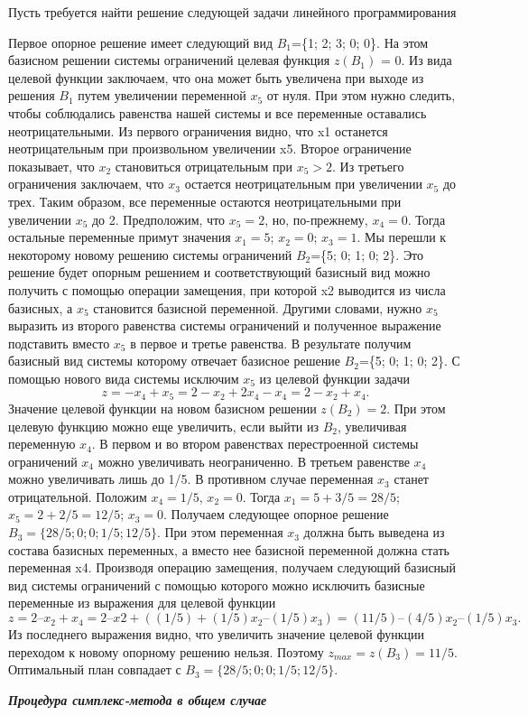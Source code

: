 \documentclass{article}
\begin{document}
Пусть требуется найти решение следующей задачи линейного программирования

Первое опорное решение имеет следующий вид $B_1$=\{1; 2; 3; 0; 0\}. На этом базисном решении системы ограничений целевая функция $z(B_1)$ = 0. Из вида целевой функции заключаем, что она может быть увеличена при выходе из решения $B_1$   путем  увеличении переменной $x_5$ от нуля. При этом нужно следить, чтобы соблюдались равенства нашей системы и все переменные оставались неотрицательными. Из первого ограничения видно, что x1 останется неотрицательным при произвольном увеличении x5. Второе ограничение показывает, что $x_2$ становиться отрицательным при $x_5 > 2$. Из третьего ограничения заключаем, что $x_3$ остается неотрицательным при увеличении $x_5$ до трех. Таким образом, все переменные остаются неотрицательными при увеличении $x_5$ до 2. Предположим, что $x_5 =2$, но, по-прежнему, $x_4= 0$. Тогда остальные переменные примут значения $x_1= 5$; $x_2= 0$; $x_3 = 1$. Мы перешли к некоторому новому решению системы ограничений $B_2$=\{5; 0; 1; 0; 2\}. Это решение будет опорным решением и соответствующий базисный вид можно получить с помощью операции замещения, при которой x2 выводится из числа базисных, а $x_5$ становится базисной переменной. Другими словами, нужно $x_5$ выразить из второго равенства системы ограничений и полученное выражение подставить вместо $x_5$ в первое и третье равенства. В результате получим базисный вид системы
которому отвечает базисное решение $B_2$=\{5; 0; 1; 0; 2\}. С помощью нового вида системы исключим $x_5$ из целевой функции задачи 
$$z = -x_4 + x_5 = 2 - x_2 + 2x_4 - x_4 = 2 - x_2 + x_4.$$
Значение целевой функции на новом базисном решении $z(B_2) = 2$. При этом целевую функцию можно еще увеличить, если выйти из $B_2$, увеличивая переменную $x_4$. В первом и во втором равенствах перестроенной системы ограничений $x_4$ можно увеличивать неограниченно. В третьем равенстве $x_4$ можно увеличивать лишь до 1/5. В противном случае переменная $x_3$ станет отрицательной. Положим $x_4 = 1/5$, $x_2 = 0$. Тогда $x_1 = 5 + 3/5 = 28/5$; $x_5 = 2 + 2 / 5 = 12 / 5$; $x_3 = 0$. Получаем следующее опорное решение $B_3=\{28/5; 0; 0; 1/5; 12/5\}$. При этом переменная $x_3$ должна быть выведена из состава базисных переменных, а вместо нее базисной переменной должна стать переменная x4. Производя операцию замещения, получаем следующий базисный вид системы ограничений
с помощью которого можно исключить базисные переменные из выражения для целевой функции
$$z = 2 – x_2 + x_4 = 2 – x2 + ((1/5) + (1/5)x_2 – (1/5)x_3) = (11/5) – (4/5)x_2 – (1/5)x_3.$$
Из последнего выражения видно, что увеличить значение целевой функции переходом к новому опорному решению нельзя. Поэтому $z_{max}= z(B_3) = 11/5$. Оптимальный план совпадает с $B_3 = \{28/5; 0; 0; 1/5; 12/5\}$.
\begin{center}
\textit{\textbf{Процедура симплекс-метода в общем случае}}
\end{center}
\end{document}
